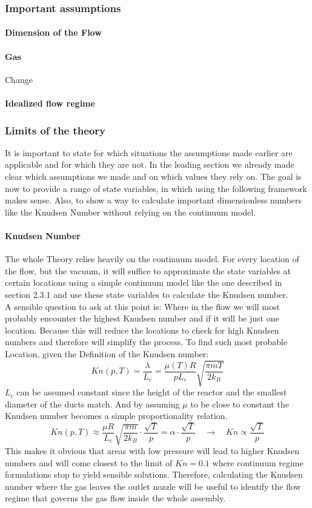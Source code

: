 \subsubsection{Important assumptions}

\paragraph{Dimension of the Flow}

\paragraph{Gas}
Change
\paragraph{Idealized flow regime}

\newpage

\subsubsection{Limits of the theory}
It is important to state for which situations the assumptions made earlier are applicable and for which they are not. In the leading section we already made clear which assumptions we made  and on which values they rely on. The goal is now to provide a range of state variables, in which using the following framework makes sense. Also, to show a way to calculate important dimensionless numbers like the Knudsen Number without relying on the continuum model.
\paragraph{Knudsen Number}
The whole Theory relies heavily on the continuum model. For every location of the flow, but the vacuum, it will suffice to approximate the state variables at certain locations using a simple continuum model like the one described in section 2.3.1  and use these state variables to calculate the Knudsen number.\\
A sensible question to ask at this point is: Where in the flow we will most probably encounter the highest Knudsen number and if it will be just one location. Because this will reduce the locations to check for high Knudsen numbers and therefore will simplify the process. To find such most probable Location, given the Definition of the Knudsen number:
$$
Kn(p,T) = \frac{\lambda}{L_c} = \frac{\mu(T)R}{pL_c}\sqrt{\frac{\pi m T}{2k_B}}
$$
$L_c$ can be assumed constant since the height of the reactor and the smallest diameter of the ducts match. And by assuming $\mu$ to be close to constant the Knudsen number becomes a simple proportionality relation.
$$
Kn(p,T)\approx\frac{\mu R}{L_c}\sqrt{\frac{\pi m}{2k_B}}\cdot\frac{\sqrt{T}}{p}=\alpha\cdot\frac{\sqrt{T}}{p}\quad\rightarrow\quad Kn\propto \frac{\sqrt{T}}{p}
$$
This makes it obvious that areas with low pressure will lead to higher Knudsen numbers and will come closest to the limit of $Kn=0.1$ where continuum regime formulations stop to yield sensible solutions. Therefore, calculating the Knudsen number where the gas leaves the outlet nozzle will be useful to identify the flow regime that governs the gas flow inside the whole assembly.  

